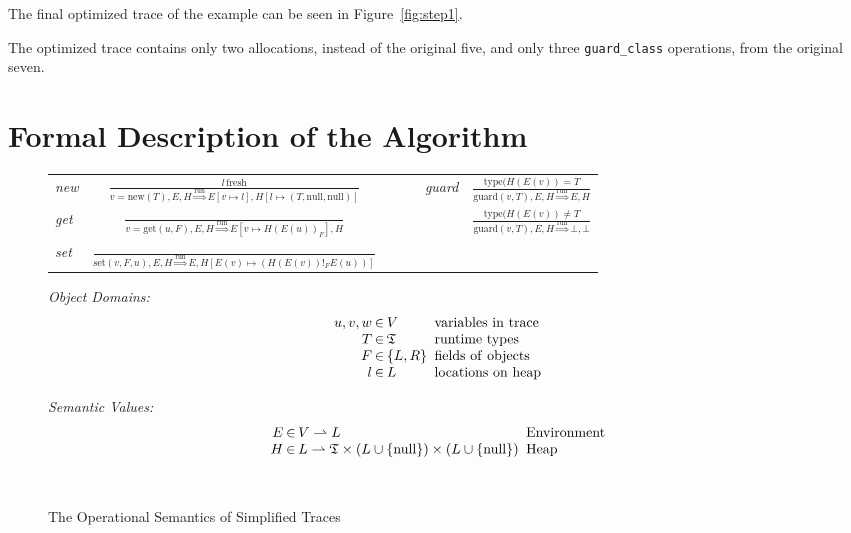\documentclass{sigplanconf}
\begin{document}
The final optimized trace of the example can be seen in
Figure~\ref{fig:step1}.

The optimized trace contains only two allocations, instead of the original five,
and only three \texttt{guard\_class} operations, from the original seven.

\section{Formal Description of the Algorithm}
\label{sec:Algorithm}


\begin{figure}
\begin{center}
\begin{tabular}{lcccc}
\emph{new} & ${\displaystyle \frac{l\,\mathrm{fresh}}{v=\mathrm{new}(T),E,H\overset{\mathrm{run}}{\Longrightarrow}E\left[v\mapsto l\right],H\left[l\mapsto\left(T,\mathrm{null},\mathrm{null}\right)\right]}}$ & ~~~ &
\emph{guard} & ${\displaystyle \frac{\mathrm{type}(H(E(v))=T}{\mathrm{guard}(v,T),E,H\overset{\mathrm{run}}{\Longrightarrow}E,H}}$\tabularnewline[3em]
\emph{get} & ${\displaystyle \frac{\,}{v=\mathrm{get}(u,F),E,H\overset{\mathrm{run}}{\Longrightarrow}E\left[v\mapsto H\left(E\left(u\right)\right)_{F}\right],H}}$ & ~~~ &
& ${\displaystyle \frac{\mathrm{type}(H(E(v))\neq T}{\mathrm{guard}(v,T),E,H\overset{\mathrm{run}}{\Longrightarrow}\bot,\bot}}$\tabularnewline[3em]
\emph{set} & ${\displaystyle \frac{\,}{\mathrm{set}\left(v,F,u\right),E,H\overset{\mathrm{run}}{\Longrightarrow}E,H\left[E\left(v\right)\mapsto\left(H\left(E\left(v\right)\right)!_{F}E(u)\right)\right]}}$ & ~~~ &
& \tabularnewline[4em]
\end{tabular}

\begin{minipage}[b]{7 cm}
\emph{Object Domains:}
$$\setlength\arraycolsep{0.1em}
 \begin{array}{rcll}
    u,v,w & \in & V & \mathrm{\ variables\ in\ trace}\\
    T & \in & \mathfrak{T} & \mathrm{\ runtime\ types}\\
    F & \in & \left\{ L,R\right\} & \mathrm{\ fields\ of\ objects}\\
    l & \in & L & \mathrm{\ locations\ on\ heap}
 \end{array}
$$
\end{minipage}
\begin{minipage}[b]{5 cm}
\emph{Semantic Values:}
$$\setlength\arraycolsep{0.1em}
 \begin{array}{rcll}
    E & \in & V\rightharpoonup L & \mathrm{\ Environment}\\
    H & \in & L\rightharpoonup\mathfrak{T}\times(L\cup \{ \mathrm{null} \})\times (L\cup \{ \mathrm{null}\} ) & \mathrm{\ Heap}\\
    \\
    \\
 \end{array}
$$
\end{minipage}
\end{center}
\label{fig:semantics}
\caption{The Operational Semantics of Simplified Traces}
\end{figure}
\end{document}
